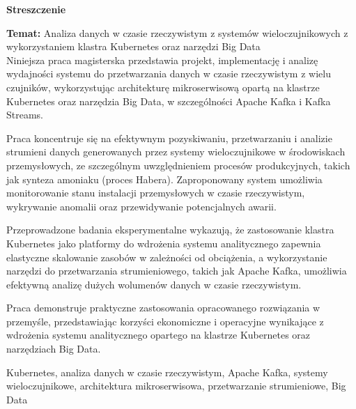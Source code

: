 \begin{abstract_pl}
\begin{center}
\textbf{\large Streszczenie}
\end{center}
\vspace{0.5em}

\noindent\textbf{Temat:} Analiza danych w czasie rzeczywistym z systemów wieloczujnikowych z wykorzystaniem klastra Kubernetes oraz narzędzi Big Data\\

Niniejsza praca magisterska przedstawia projekt, implementację i analizę wydajności systemu do przetwarzania danych w czasie rzeczywistym z wielu czujników, wykorzystując architekturę mikroserwisową opartą na klastrze Kubernetes oraz narzędzia Big Data, w szczególności Apache Kafka i Kafka Streams.

Praca koncentruje się na efektywnym pozyskiwaniu, przetwarzaniu i analizie strumieni danych generowanych przez systemy wieloczujnikowe w środowiskach przemysłowych, ze szczególnym uwzględnieniem procesów produkcyjnych, takich jak synteza amoniaku (proces Habera). Zaproponowany system umożliwia monitorowanie stanu instalacji przemysłowych w czasie rzeczywistym, wykrywanie anomalii oraz przewidywanie potencjalnych awarii.

Przeprowadzone badania eksperymentalne wykazują, że zastosowanie klastra Kubernetes jako platformy do wdrożenia systemu analitycznego zapewnia elastyczne skalowanie zasobów w zależności od obciążenia, a wykorzystanie narzędzi do przetwarzania strumieniowego, takich jak Apache Kafka, umożliwia efektywną analizę dużych wolumenów danych w czasie rzeczywistym.

Praca demonstruje praktyczne zastosowania opracowanego rozwiązania w przemyśle, przedstawiając korzyści ekonomiczne i operacyjne wynikające z wdrożenia systemu analitycznego opartego na klastrze Kubernetes oraz narzędziach Big Data.

\begin{keywords}
Kubernetes, analiza danych w czasie rzeczywistym, Apache Kafka, systemy wieloczujnikowe, architektura mikroserwisowa, przetwarzanie strumieniowe, Big Data
\end{keywords}
\end{abstract_pl}